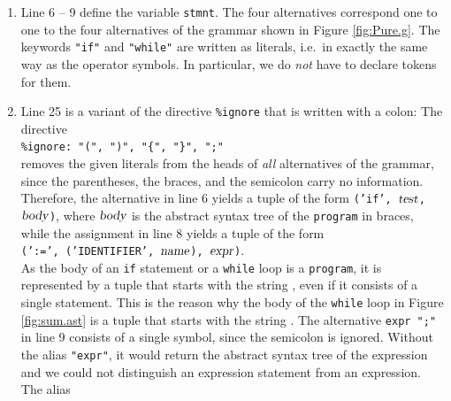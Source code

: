 \begin{enumerate}
      As the alternative \texttt{stmnt*} contains no literal, the name of the rule is used as the head of
      the tuple.  Hence, a program consisting of the statements $s_1$, $\cdots$, $s_n$ is represented as the tuple
      \texttt{('program', $s_1$, $\cdots$, $s_n$)}.  Note that the head of a tuple is determined by the grammar
      and not by the input:  Even a program that consists of a single statement is represented by a tuple
      with the head .
\item Line 6 -- 9 define the variable \texttt{stmnt}.  The four alternatives correspond one to one to the
      four alternatives of the grammar shown in Figure \ref{fig:Pure.g}.  The keywords \texttt{"if"} and
      \texttt{"while"} are written as literals, i.e.~in exactly the same way as the operator symbols.  In
      particular, we do \emph{not} have to declare tokens for them.
\item Line 25 is a variant of the directive \texttt{\%ignore} that is written with a colon:  The directive
      \\[0.2cm]
      \hspace*{1.3cm}
      \verb|%ignore: "(", ")", "{", "}", ";"|
      \\[0.2cm]
      removes the given literals from the heads of \emph{all} alternatives of the grammar, since the
      parentheses, the braces, and the semicolon carry no information.  Therefore, the alternative in line 6
      yields a tuple of the form \texttt{('if', $\textsl{test}$, $\textsl{body}$)}, where $\textsl{body}$ is
      the abstract syntax tree of the \texttt{program} in braces, while the assignment in line 8 yields a tuple
      of the form
      \\[0.2cm]
      \hspace*{1.3cm}
      \texttt{(':=', ('IDENTIFIER', $\textsl{name}$), $\textsl{expr}$)}.
      \\[0.2cm]
      As the body of an \texttt{if} statement or a \texttt{while} loop is a \texttt{program}, it is
      represented by a tuple that starts with the string , even if it consists of a single
      statement.  This is the reason why the body of the \texttt{while} loop in Figure \ref{fig:sum.ast} is a
      tuple that starts with the string .  The alternative \texttt{expr ";"} in line 9
      consists of a single symbol, since the semicolon is ignored.  Without the alias \texttt{"expr"}, it would return the abstract syntax tree
      of the expression and we could not distinguish an expression statement from an expression.  The alias

\end{enumerate}
